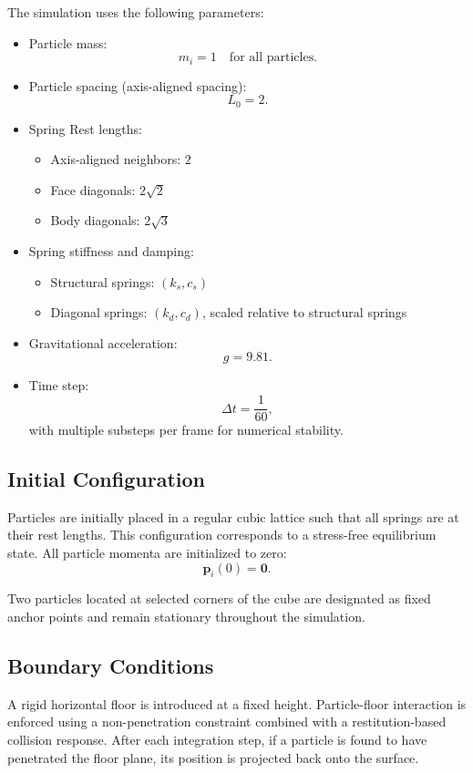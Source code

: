 \documentclass[manuscript,nonacm,12pt,letterpaper]{acmart}
\begin{document}
The simulation uses the following parameters:
\begin{itemize}
    \item Particle mass:
    \[
    m_i = 1 \quad \text{for all particles}.
    \]
    \item Particle spacing (axis-aligned spacing):
    \[
    L_0 = 2.
    \]
    \item Spring Rest lengths:
    \begin{itemize}
        \item Axis-aligned neighbors: $2$
        \item Face diagonals: $2\sqrt{2}$
        \item Body diagonals: $2\sqrt{3}$
    \end{itemize}
    \item Spring stiffness and damping:
    \begin{itemize}
        \item Structural springs: $(k_s, c_s)$
        \item Diagonal springs: $(k_d, c_d)$, scaled relative to structural springs
    \end{itemize}
    \item Gravitational acceleration:
    \[
    g = 9.81.
    \]
    \item Time step:
    \[
    \Delta t = \frac{1}{60},
    \]
    with multiple substeps per frame for numerical stability.
\end{itemize}

\subsection{Initial Configuration}
\label{Sec3.1:InitialConfig}

Particles are initially placed in a regular cubic lattice such that all springs are at their rest lengths. This configuration corresponds to a stress-free equilibrium state. All particle momenta are initialized to zero:
\[
\mathbf{p}_i(0) = \mathbf{0}.
\]

Two particles located at selected corners of the cube are designated as fixed anchor points and remain stationary throughout the simulation.

\subsection{Boundary Conditions}
\label{Sec3.2:BoundaryConditions}

A rigid horizontal floor is introduced at a fixed height. Particle-floor interaction is enforced using a non-penetration constraint combined with a restitution-based collision response. After each integration step, if a particle is found to have penetrated the floor plane, its position is projected back onto the surface.
\end{document}
